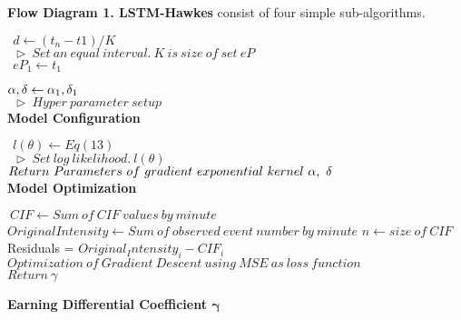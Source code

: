 \documentclass[10pt,letterpaper]{article}
\begin{document}
\textbf{Flow Diagram 1. LSTM-Hawkes		}consist of four simple sub-algorithms.	
%
\begin{algorithm}[H]
 $\ \ d \leftarrow (t_n - t1)/K$\\ 
 $\ \ \triangleright \ Set\ an\ equal\ interval.\ K\ is\ size\ of\ set\ eP$\\
 $\ \ eP_1 \leftarrow t_1$\\ 


$\newline\alpha, \delta \leftarrow \alpha_1 , \delta_1$ \\
 $\ \ \triangleright	\ Hyper\ parameter\ setup$\\
  \caption{\bf Model Configuration} 
  \label{algorithm1}
\end{algorithm}
%
\begin{algorithm}[H]
 \KwResult{$\alpha, \delta, \gamma$}
  $\ \ l(\theta) \leftarrow Eq(13)$\\
  $\ \ \triangleright \ Set\ log\ likelihood.\ l(\theta)$\\

  $\newline Return\ Parameters\ of\ gradient\ exponential\ kernel\ \alpha,\ \delta$\\
  
 \caption{\bf Model Optimization}
 \label{algorithm2}
\end{algorithm} 


%
\begin{algorithm}[H]
 \KwResult{$\gamma$}
 
 	$\  CIF \leftarrow Sum\ of\ CIF\ values\ by\ minute$ 
	$OriginalIntensity \leftarrow Sum\ of\ observed\ event\ number\ by\ minute$
	$n \leftarrow size\ of\ CIF$\\
 {Residuals = $Original_Intensity_i - CIF_i$\\
  $Optimization\ of\ Gradient\ Descent\ using\ MSE\ as\ loss\ function$\\
  $Return\ \gamma$}
 \caption{\bf Earning Differential Coefficient $\boldsymbol{\gamma}$}
 \label{algorithm3}
\end{algorithm}
\end{document}
